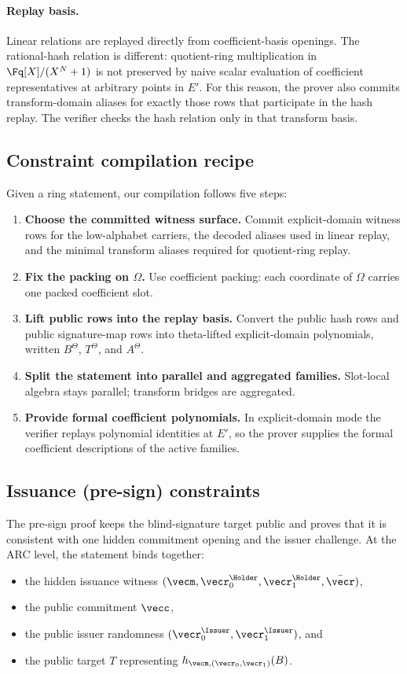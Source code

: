 \paragraph{Replay basis.}
Linear relations are replayed directly from coefficient-basis openings. The
rational-hash relation is different: quotient-ring multiplication in
\(\Fq[X]/(X^N+1)\) is not preserved by naive scalar evaluation of coefficient
representatives at arbitrary points in \(E'\). For this reason, the prover also
commits transform-domain aliases for exactly those rows that participate in the
hash replay. The verifier checks the hash relation only in that transform
basis.

\subsection{Constraint compilation recipe}
Given a ring statement, our compilation follows five steps:
\begin{enumerate}[leftmargin=1.25em]
  \item \textbf{Choose the committed witness surface.}
  Commit explicit-domain witness rows for the low-alphabet carriers, the
  decoded aliases used in linear replay, and the minimal transform aliases
  required for quotient-ring replay.
  \item \textbf{Fix the packing on \(\Omega\).}
  Use coefficient packing: each coordinate of \(\Omega\) carries one packed
  coefficient slot.
  \item \textbf{Lift public rows into the replay basis.}
  Convert the public hash rows and public signature-map rows into
  theta-lifted explicit-domain polynomials, written
  \(B^\Theta\), \(T^\Theta\), and \(A^\Theta\).
  \item \textbf{Split the statement into parallel and aggregated families.}
  Slot-local algebra stays parallel; transform bridges are aggregated.
  \item \textbf{Provide formal coefficient polynomials.}
  In explicit-domain mode the verifier replays polynomial identities at
  \(E'\), so the prover supplies the formal coefficient descriptions of the
  active families.
\end{enumerate}

\subsection{Issuance (pre-sign) constraints}
\label{subsec:smallwood-issuance}
The pre-sign proof keeps the blind-signature target public and proves that it
is consistent with one hidden commitment opening and the issuer challenge. At
the ARC level, the statement binds together:
\begin{itemize}[leftmargin=1.25em]
  \item the hidden issuance witness
  \((\vecm,\vecr_0^{\Holder},\vecr_1^{\Holder},\bar\vecr)\),
  \item the public commitment \(\vecc\),
  \item the public issuer randomness
  \((\vecr_0^{\Issuer},\vecr_1^{\Issuer})\), and
  \item the public target \(T\) representing
  \(h_{\vecm,(\vecr_0,\vecr_1)}(B)\).
\end{itemize}

